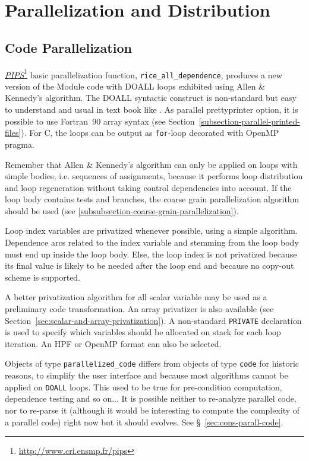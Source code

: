 \documentclass[a4paper]{report}
\newcommand{\LINK}[2]{\href{#2}{#1}\footnote{\url{#2}}\xspace}
\newcommand{\PIPS}{\LINK{\emph{PIPS}}{http://www.cri.ensmp.fr/pips}}
\begin{document}
\chapter{Parallelization and Distribution}
\label{section-program-transformations-parallelization-distribution}

\section{Code Parallelization}
\label{subsection-parallelization}

\PIPS{} basic parallelization function, \verb+rice_all_dependence+,
produces a new version of the Module code with DOALL loops exhibited using
A{\sc llen} \& K{\sc ennedy}'s algorithm. The DOALL syntactic construct is
non-standard but easy to understand and usual in text book like \cite{Wolfe96}.
As parallel prettyprinter option, it is possible to use Fortran~90 array
syntax (see Section~\ref{subsection-parallel-printed-files}). For C, the
loops can be output as \texttt{for}-loop decorated with OpenMP pragma.

Remember that A{\sc llen} \& K{\sc ennedy}'s algorithm can only be applied
on loops with simple bodies, i.e. sequences of assignments, because it
performs loop distribution and loop regeneration without taking control
dependencies into account. If the loop body contains tests and branches,
the coarse grain parallelization algorithm should be used (see
\ref{subsubsection-coarse-grain-parallelization}).

Loop index variables are privatized whenever possible, using a simple
algorithm. Dependence arcs related to the index variable and stemming
from the loop body must end up inside the loop body. Else, the loop
index is not privatized because its final value is likely to be needed
after the loop end and because no copy-out scheme is supported.

A better privatization algorithm for all scalar variable may be used as a
preliminary code transformation. An array privatizer is also available
(see Section~\ref{sec:scalar-and-array-privatization}). A non-standard
{\tt PRIVATE} declaration is used to specify which variables should be
allocated on stack for each loop iteration. An HPF or OpenMP format can
also be selected.

Objects of type \verb+parallelized_code+ differs from objects of type
\verb+code+ for historic reasons, to simplify the user interface and
because most algorithms cannot be applied on {\tt DOALL} loops. This used
to be true for pre-condition computation, dependence testing and so
on... It is possible neither to re-analyze parallel code, nor to re-parse
it (although it would be interesting to compute the complexity of a
parallel code) right now but it should evolves. See
\S~\ref{sec:cons-parall-code}.
\end{document}
